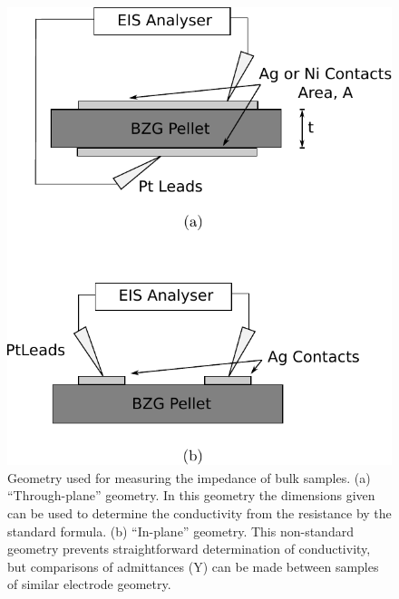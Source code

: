 \begin{figure}
\centering
\includegraphics{Figures/bulkElectrodeGeometry.pdf}
  \caption{Geometry used for measuring the impedance of bulk samples. (a) ``Through-plane'' geometry. In this geometry the dimensions given can be used to determine the conductivity from the resistance by the standard formula. (b) ``In-plane'' geometry. This non-standard geometry prevents straightforward determination of conductivity, but comparisons of admittances (Y) can be made between samples of similar electrode geometry.}
  \label{fig:bulk:geometry}
\end{figure}

